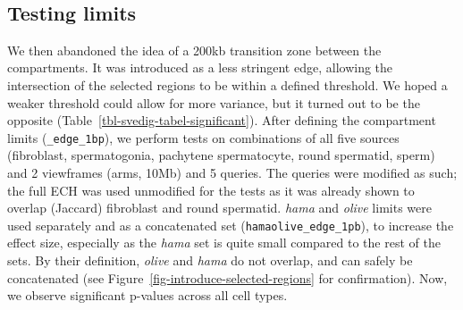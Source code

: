 \documentclass[
  11pt,
  a4paper,
]{scrbook}
\let\origfigure\figure
\let\endorigfigure\endfigure
\renewenvironment{figure}[1][2] {
    \expandafter\origfigure\expandafter[htbp]
} {
    \endorigfigure
}
\begin{document}
\begin{figure}
\begin{minipage}[t]{0.49\linewidth}
{}


\end{minipage}%
%
\begin{minipage}[t]{0.01\linewidth}
~\end{minipage}%

\caption{\label{fig-baboon-rs100-intersect}Comparing the A-compartment
edges of round spermatid (RS) with regions in baboons from hybrid
population where a) 95\% of sampled individuals have \emph{Papio
hamadryas} ancestry or b) 100\% of the samples have \emph{Papio anubis}
ancestry. The regions are extracted and lifted from PapAnu4 to rhemac10
using segment\_liftover.}

\end{figure}%

\subsection{Testing limits}\label{testing-limits}

We then abandoned the idea of a 200kb transition zone between the
compartments. It was introduced as a less stringent edge, allowing the
intersection of the selected regions to be within a defined threshold.
We hoped a weaker threshold could allow for more variance, but it turned
out to be the opposite (Table~\ref{tbl-svedig-tabel-significant}). After
defining the compartment limits (\texttt{\_edge\_1bp}), we perform tests
on combinations of all five sources (fibroblast, spermatogonia,
pachytene spermatocyte, round spermatid, sperm) and 2 viewframes (arms,
10Mb) and 5 queries. The queries were modified as such; the full ECH was
used unmodified for the tests as it was already shown to overlap
(Jaccard) fibroblast and round spermatid. \emph{hama} and \emph{olive}
limits were used separately and as a concatenated set
(\texttt{hamaolive\_edge\_1pb}), to increase the effect size, especially
as the \emph{hama} set is quite small compared to the rest of the sets.
By their definition, \emph{olive} and \emph{hama} do not overlap, and
can safely be concatenated (see
Figure~\ref{fig-introduce-selected-regions} for confirmation). Now, we
observe significant p-values across all cell types.
\end{document}
